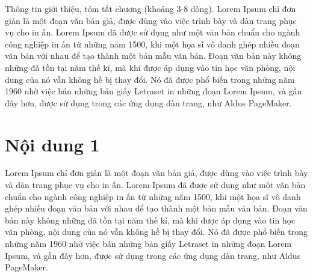 Thông tin giới thiệu, tóm tắt chương (khoảng 3-8 dòng). Lorem Ipsum chỉ đơn giản là một đoạn văn bản giả, được dùng vào việc trình bày và dàn trang phục vụ cho in ấn. Lorem Ipsum đã được sử dụng như một văn bản chuẩn cho ngành công nghiệp in ấn từ những năm 1500, khi một họa sĩ vô danh ghép nhiều đoạn văn bản với nhau để tạo thành một bản mẫu văn bản. Đoạn văn bản này không những đã tồn tại năm thế kỉ, mà khi được áp dụng vào tin học văn phòng, nội dung của nó vẫn không hề bị thay đổi. Nó đã được phổ biến trong những năm 1960 nhờ việc bán những bản giấy Letraset in những đoạn Lorem Ipsum, và gần đây hơn, được sử dụng trong các ứng dụng dàn trang, như Aldus PageMaker.

\section{Nội dung 1}
Lorem Ipsum chỉ đơn giản là một đoạn văn bản giả, được dùng vào việc trình bày và dàn trang phục vụ cho in ấn. Lorem Ipsum đã được sử dụng như một văn bản chuẩn cho ngành công nghiệp in ấn từ những năm 1500, khi một họa sĩ vô danh ghép nhiều đoạn văn bản với nhau để tạo thành một bản mẫu văn bản. Đoạn văn bản này không những đã tồn tại năm thế kỉ, mà khi được áp dụng vào tin học văn phòng, nội dung của nó vẫn không hề bị thay đổi. Nó đã được phổ biến trong những năm 1960 nhờ việc bán những bản giấy Letraset in những đoạn Lorem Ipsum, và gần đây hơn, được sử dụng trong các ứng dụng dàn trang, như Aldus PageMaker.